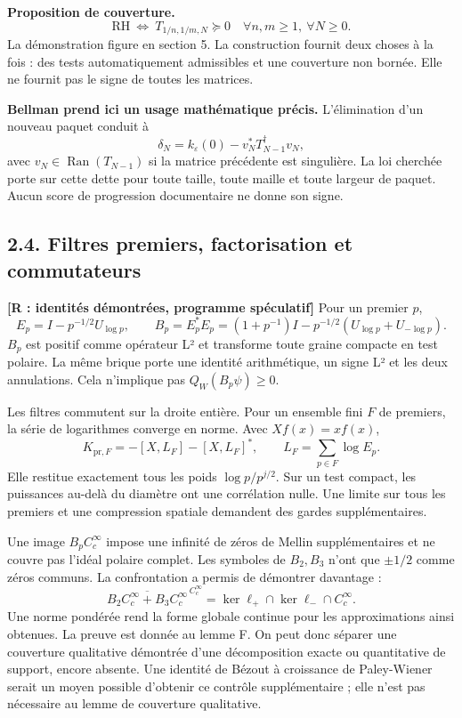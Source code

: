 \documentclass[
  10pt,
  a4paper,
]{article}
\begin{document}
\textbf{Proposition de couverture.} \[
\boxed{\mathrm{RH}\ \Longleftrightarrow\
T_{1/n,1/m,N}\succeq0\quad\forall n,m\ge1,\ \forall N\ge0.}
\] La démonstration figure en section 5. La construction fournit deux
choses à la fois : des tests automatiquement admissibles et une
couverture non bornée. Elle ne fournit pas le signe de toutes les
matrices.

\textbf{Bellman prend ici un usage mathématique précis.} L'élimination
d'un nouveau paquet conduit à \[
\delta_N=k_\varepsilon(0)-v_N^*T_{N-1}^{\dagger}v_N,
\] avec \(v_N\in\operatorname{Ran}(T_{N-1})\) si la matrice précédente
est singulière. La loi cherchée porte sur cette dette pour toute taille,
toute maille et toute largeur de paquet. Aucun score de progression
documentaire ne donne son signe.

\hypertarget{filtres-premiers-factorisation-et-commutateurs}{%
\subsection{2.4. Filtres premiers, factorisation et
commutateurs}\label{filtres-premiers-factorisation-et-commutateurs}}

\textbf{{[}R : identités démontrées, programme spéculatif{]}} Pour un
premier \(p\), \[
E_p=I-p^{-1/2}U_{\log p},\qquad
B_p=E_p^*E_p=(1+p^{-1})I-p^{-1/2}(U_{\log p}+U_{-\log p}).
\] \(B_p\) est positif comme opérateur L² et transforme toute graine
compacte en test polaire. La même brique porte une identité
arithmétique, un signe L² et les deux annulations. Cela n'implique pas
\(Q_W(B_p\psi)\ge0\).

Les filtres commutent sur la droite entière. Pour un ensemble fini \(F\)
de premiers, la série de logarithmes converge en norme. Avec
\(Xf(x)=xf(x)\), \[
K_{\mathrm{pr},F}=-[X,L_F]-[X,L_F]^*,\qquad
L_F=\sum_{p\in F}\log E_p.
\] Elle restitue exactement tous les poids \(\log p/p^{j/2}\). Sur un
test compact, les puissances au-delà du diamètre ont une corrélation
nulle. Une limite sur tous les premiers et une compression spatiale
demandent des gardes supplémentaires.

Une image \(B_pC_c^\infty\) impose une infinité de zéros de Mellin
supplémentaires et ne couvre pas l'idéal polaire complet. Les symboles
de \(B_2,B_3\) n'ont que \(\pm1/2\) comme zéros communs. La
confrontation a permis de démontrer davantage : \[
\boxed{\overline{B_2C_c^\infty+B_3C_c^\infty}^{\,C_c^\infty}
=\ker\ell_+\cap\ker\ell_-\cap C_c^\infty.}
\] Une norme pondérée rend la forme globale continue pour les
approximations ainsi obtenues. La preuve est donnée au lemme F. On peut
donc séparer une couverture qualitative démontrée d'une décomposition
exacte ou quantitative de support, encore absente. Une identité de
Bézout à croissance de Paley-Wiener serait un moyen possible d'obtenir
ce contrôle supplémentaire ; elle n'est pas nécessaire au lemme de
couverture qualitative.
\end{document}
